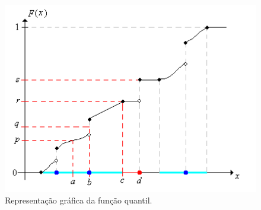 \begin{frame}
	
	\begin{figure}[!htb]
		\begin{center}
			\includegraphics[scale=0.3]{quantile.png} 
			\caption{\label{figquant} Representação gráfica da função quantil.}
		\end{center}
	\end{figure}
	

\end{frame}
